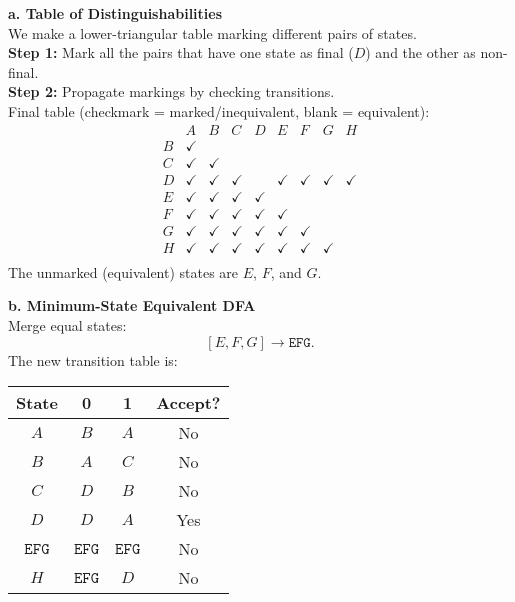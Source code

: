 \documentclass{article}
\theoremstyle{theorem}
\theoremstyle{definition}
\theoremstyle{remark}
\begin{document}
\textbf{a. Table of Distinguishabilities}\\[1mm]
We make a lower-triangular table marking different pairs of states.\\[1mm]
\textbf{Step 1:} Mark all the pairs that have one state as final (\(D\)) and the other as non-final.\\[1mm]
\textbf{Step 2:} Propagate markings by checking transitions.\\[1mm]
Final table (checkmark = marked/inequivalent, blank = equivalent):
\[
\begin{array}{c|cccccccc}
& A & B & C & D & E & F & G & H\\ \hline
B & \checkmark &  &  &  &  &  &  &  \\
C & \checkmark & \checkmark &  &  &  &  &  &  \\
D & \checkmark & \checkmark & \checkmark &  & \checkmark & \checkmark & \checkmark & \checkmark \\
E & \checkmark & \checkmark & \checkmark & \checkmark &  &  &  &  \\
F & \checkmark & \checkmark & \checkmark & \checkmark & \checkmark &  &  &  \\
G & \checkmark & \checkmark & \checkmark & \checkmark & \checkmark & \checkmark &  &  \\
H & \checkmark & \checkmark & \checkmark & \checkmark & \checkmark & \checkmark & \checkmark &  \\
\end{array}
\]
The unmarked (equivalent) states are \(E\), \(F\), and \(G\).

\medskip

\textbf{b. Minimum-State Equivalent DFA}\\[1mm]
Merge equal states:
\[
[E, F, G] \to \texttt{EFG}.
\]
The new transition table is:
\begin{center}
\begin{tabular}{|c|c|c|c|}
\hline
State & 0   & 1   & Accept? \\ \hline
\(A\) & \(B\) & \(A\) & No \\ \hline
\(B\) & \(A\) & \(C\) & No \\ \hline
\(C\) & \(D\) & \(B\) & No \\ \hline
\(D\) & \(D\) & \(A\) & Yes \\ \hline
\(\texttt{EFG}\) & \(\texttt{EFG}\) & \(\texttt{EFG}\) & No \\ \hline
\(H\) & \(\texttt{EFG}\) & \(D\) & No \\ \hline
\end{tabular}
\end{center}
\end{document}
